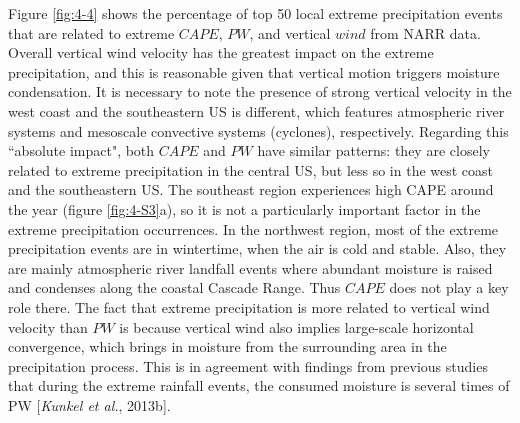 Figure \ref{fig:4-4} shows the percentage of top 50 local extreme precipitation events that are related to extreme $CAPE$, $PW$, and vertical $wind$ from NARR data. Overall vertical wind velocity has the greatest impact on the extreme precipitation, and this is reasonable given that vertical motion triggers moisture condensation. It is necessary to note the presence of strong vertical velocity in the west coast and the southeastern US is different, which features atmospheric river systems and mesoscale convective systems (cyclones), respectively. Regarding this ``absolute impact", both $CAPE$ and $PW$ have similar patterns: they are closely related to extreme precipitation in the central US, but less so in the west coast and the southeastern US. The southeast region experiences high CAPE around the year (figure \ref{fig:4-S3}a), so it is not a particularly important factor in the extreme precipitation occurrences. In the northwest region, most of the extreme precipitation events are in wintertime, when the air is cold and stable. Also, they are mainly atmospheric river landfall events where abundant moisture is raised and condenses along the coastal Cascade Range. Thus $CAPE$ does not play a key role there. The fact that extreme precipitation is more related to vertical wind velocity than $PW$ is because vertical wind also implies large-scale horizontal convergence, which brings in moisture from the surrounding area in the precipitation process. This is in agreement with findings from previous studies that during the extreme rainfall events, the consumed moisture is several times of PW [\textit{Kunkel et al.}, 2013b].


